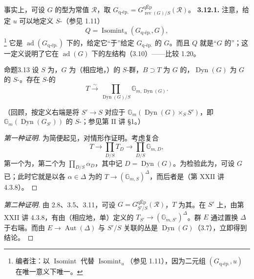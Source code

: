 事实上，可设 $G$ 的型为常值 $\mathcal R$，取 $G_{\mathrm{q\text{-}ép.}}=G^{\mathrm{qÉp}}_{\operatorname{rev}(G)/S}(\mathcal R)$。
\textbf{3.12.1.} 注意，给定 $u$ 可以地定义 $S$-（参见 1.11）
\[Q=\operatorname{Isomint}_u(G_{\mathrm{q\text{-}ép.}},G),\]
\footnote[18]{编者注：以 $\operatorname{Isomint}$ 代替 $\operatorname{Isomint}_u$（参见 1.11），因为二元组 $(G_{\mathrm{q\text{-}ép.}},u)$ 在唯一意义下唯一。}
它是 $\operatorname{ad}(G_{\mathrm{q\text{-}ép.}})$ 下的，给定它“于”给定 $G_{\mathrm{q\text{-}ép.}}$ 的 $G$。而且 $Q$ 就是“$G$ 的”；这一定义说明了它在 $\operatorname{ad}(G)$ 下的左结构（3.10）——比较 1.20。
\begin{SGAresult}{命题}{3.13}
设 $S$ 为，$G$ 为（相应地，）的 $S$-群，$B\supset T$ 为 $G$ 的，$\operatorname{Dyn}(G)$ 为 $G$ 的 $S$-。存在 $S$-的
\[T\xrightarrow\sim\prod_{\operatorname{Dyn}(G)/S}\mathbb G_{m,\operatorname{Dyn}(G)}.\]
\end{SGAresult}
（回顾，按定义右端是将 $S'\to S$ 对应于 $\mathbb G_m(\operatorname{Dyn}(G)\times_SS')$，即 $\mathbb G_m(\operatorname{Dyn}(G_{S'}))$ 的 $S$-；参见第 II 讲 §1。）
\begin{proof}[第一种证明]
为简便起见，对情形作证明。考虑复合
\[T\longrightarrow\prod_{D/S}T_D\longrightarrow\prod_{D/S}\mathbb G_{m,D},\]
第一个为，第二个为 $\prod_{D/S}\alpha_D$，其中记 $D=\operatorname{Dyn}(G)$。为检验此为，可设 $G$ 已；此时它就是以各 $\alpha\in\Delta$ 为的 $T\to(\mathbb G_{m,S})^\Delta$，而后者是（第 XXII 讲 4.3.8）。
\end{proof}
\begin{proof}[第二种证明]
由 2.8、3.5、3.11，可设 $G=G^{\mathrm{qÉp}}_{S'/S}(\mathcal R)$，$T$ 为其。在 $S'$ 上，由第 XXII 讲 4.3.8，有由（相应地，单）定义的 $T_{S'}\to(\mathbb G_{m,S'})^\Delta$。群 $E$ 通过置换 $\Delta$ 于右端。而由 $E\to\operatorname{Aut}(\Delta)$ 与 $S'/S$ 关联的丛是 $\operatorname{Dyn}(G)$（3.7），立即得到结论。
\end{proof}
